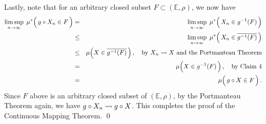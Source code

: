 \vskip 0.5cm
\noindent
Lastly, note that for an arbitrary closed subset $F \subset (\mathbb{E},\rho)$, we now have
\begin{eqnarray*}
\underset{n\rightarrow\infty}{\limsup}\;\, \mu^{*}\!\left(\,g \circ X_{n} \overset{{\color{white}.}}{\in} F\,\right)
&=&
	\underset{n\rightarrow\infty}{\limsup}\;\, \mu^{*}\!\left(\,X_{n} \overset{{\color{white}.}}{\in} g^{-1}(F)\,\right)
\\
&\leq&
	\underset{n\rightarrow\infty}{\limsup}\;\, \mu^{*}\!\left(\,X_{n} \overset{{\color{white}.}}{\in} \overline{g^{-1}(F)}\,\right)
\\
&\leq&
	\mu\!\left(X\overset{{\color{white}.}}{\in}\overline{g^{-1}(F)}\,\right),
	\quad\textnormal{by $X_{n} \wconverge X$ and the Portmanteau Theorem}
\\
&=&
	\mu\!\left(X\overset{{\color{white}.}}{\in}g^{-1}(F)\,\right),
	\quad\textnormal{by Claim 4}
\\
&=&
	\mu\!\left(\,g \circ X\overset{{\color{white}.}}{\in}F\,\right).
\end{eqnarray*}
Since $F$ above is an arbitrary closed subset of $(\mathbb{E},\rho)$,
by the Portmanteau Theorem again, we have \;$g \circ X_{n} \rightsquigarrow g \circ X$.
This completes the proof of the Continuous Mapping Theorem.
\qed


